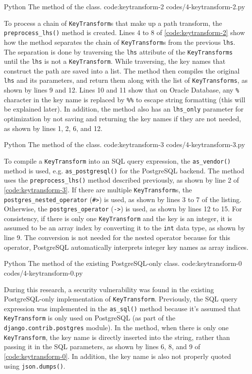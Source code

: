 \listing
{Python}
{The  method of the  class.}
{code:keytransform-2}
{codes/4-keytransform-2.py}

To process a chain of \verb|KeyTransform|s that make up a path transform, the
\verb|preprocess_lhs()| method is created. Lines 4 to 8 of
\autoref{code:keytransform-2} show how the method separates the chain of
\verb|KeyTransform|s from the previous \verb|lhs|. The separation is done by
traversing the \verb|lhs| attribute of the \verb|KeyTransforms| until the
\verb|lhs| is not a \verb|KeyTransform|. While traversing, the key names that
construct the path are saved into a list. The method then compiles the original
\verb|lhs| and its parameters, and return them along with the list of
\verb|KeyTransforms|, as shown by lines 9 and 12. Lines 10 and 11 show that on
Oracle Database, any \verb|%| character in the key name is replaced by
\verb|%%| to escape string formatting (this will be explained later). In
addition, the method also has an \verb|lhs_only| parameter for optimization by
not saving and returning the key names if they are not needed, as shown by
lines 1, 2, 6, and 12.

\listing
{Python}
{The  method of the  class.}
{code:keytransform-3}
{codes/4-keytransform-3.py}

To compile a \verb|KeyTransform| into an SQL query expression, the
\verb|as_vendor()| method is used, e.g. \verb|as_postgresql()| for the
PostgreSQL backend. The method uses the \verb|preprocess_lhs()| method
described previously, as shown by line 2 of \autoref{code:keytransform-3}. If
there are multiple \verb|KeyTransform|s, the \verb|postgres_nested_operator|
(\verb|#>|) is used, as shown by lines 3 to 7 of the listing. Otherwise, the
\verb|postgres_operator| (\verb|->|) is used, as shown by lines 12 to 15. For
consistency, if there is only one \verb|KeyTransform| and the key is an
integer, it is assumed to be an array index by converting it to the \verb|int|
data type, as shown by line 9. The conversion is not needed for the nested
operator because for this operator, PostgreSQL automatically interprets integer
key names as array indices.

\listing
{Python}
{The  method of the existing PostgreSQL-only  class.}
{code:keytransform-0}
{codes/4-keytransform-0.py}

During this research, a security vulnerability was found in the existing
PostgreSQL-only implementation of \verb|KeyTransform|. Previously, the SQL
query expression was implemented in the \verb|as_sql()| method because it's
assumed that \verb|KeyTransform| is only used on PostgreSQL (as part of the
\verb|django.contrib.postgres| module). In the method, when there is only one
\verb|KeyTransform|, the key name is directly inserted into the string, rather
than passing it in the SQL parameters, as shown by lines 6, 8, and 9 of
\autoref{code:keytransform-0}. In addition, the key name is also not properly
quoted using \verb|json.dumps()|.


